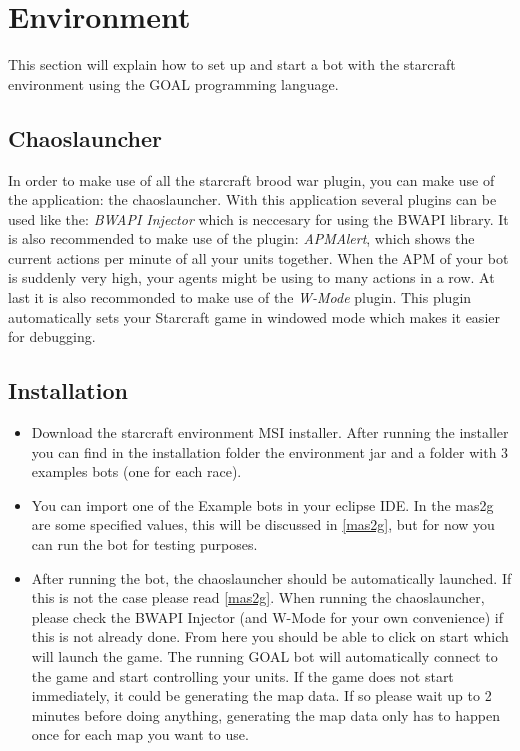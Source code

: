\chapter{Environment}
This section will explain how to set up and start a bot with the starcraft environment using the GOAL programming language.

\section{Chaoslauncher}
In order to make use of all the starcraft brood war plugin, you can make use of the application: the chaoslauncher. With this application several plugins can be used like the: \textit{BWAPI Injector} which is neccesary for using the BWAPI library. It is also recommended to make use of the plugin: \textit{APMAlert}, which shows the current actions per minute of all your units together. When the APM of your bot is suddenly very high, your agents might be using to many actions in a row. At last it is also recommonded to make use of the \textit{W-Mode} plugin. This plugin automatically sets your Starcraft game in windowed mode which makes it easier for debugging. 

\section{Installation}
\begin{itemize}
    \item Download the starcraft environment MSI installer. After running the installer you can find in the installation folder the environment jar and a folder with 3 examples bots (one for each race).
    \item You can import one of the Example bots in your eclipse IDE. In the mas2g are some specified values, this will be discussed in \ref{mas2g}, but for now you can run the bot for testing purposes.
    \item After running the bot, the chaoslauncher should be automatically launched. If this is not the case please read \ref{mas2g}. When running the chaoslauncher, please check the BWAPI Injector (and W-Mode for your own convenience) if this is not already done. From here you should be able to click on start which will launch the game. The running GOAL bot will automatically connect to the game and start controlling your units. If the game does not start immediately, it could be generating the map data. If so please wait up to 2 minutes before doing anything, generating the map data only has to happen once for each map you want to use.
\end{itemize}

